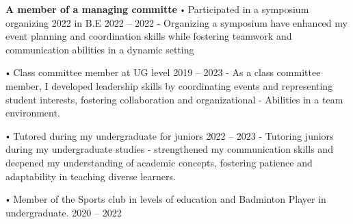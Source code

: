 \documentclass{article}
\renewcommand{\labelitemi}{
        $\vcenter{\hbox{\tiny$\bullet$}}$\hspace*{3pt}
        }
\renewcommand{\labelitemii}{
        $\vcenter{\hbox{\tiny$\bullet$}}$\hspace*{-3pt}
        }
\newenvironment{bullet-list-major}{
          \begin{list}{\labelitemii}{\setlength\leftmargin{3pt} 
          \topsep 0pt \itemsep -2pt}}{\vspace*{4pt}\end{list}
          }
\begin{document}
      {
            \begin{bullet-list-major}
            \item \textbf{A member of a managing committe} \labelitemi Participated in a symposium organizing 2022 in B.E \hfill 2022 -- 2022
            \newline -{ Organizing a symposium have enhanced my event planning and coordination skills while fostering teamwork and communication abilities in a dynamic setting}
            \end{bullet-list-major}
            

            \begin{bullet-list-major}
            \item \textbf{} \labelitemi Class committee member at UG level \hfill 2019 -- 2023
            \newline -{ As a class committee member, I developed leadership skills by coordinating events and representing student interests, fostering collaboration and organizational
}\newline -{ Abilities in a team environment.}
            \end{bullet-list-major}
            

            \begin{bullet-list-major}
            \item \textbf{} \labelitemi Tutored during my undergraduate for juniors \hfill 2022 -- 2023
            \newline -{ Tutoring juniors during my undergraduate studies
}\newline -{ strengthened my communication skills and deepened my understanding of academic concepts, fostering patience and adaptability in teaching diverse learners.}
            \end{bullet-list-major}
            

            \begin{bullet-list-major}
            \item \textbf{} \labelitemi Member of the Sports club in levels of education and Badminton Player in undergraduate. \hfill 2020 -- 2022
            
            \end{bullet-list-major}
            }
      
\end{document}
